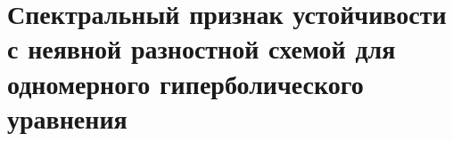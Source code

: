 \documentclass[__main__.tex]{subfiles}
\begin{document}
\section{Спектральный признак устойчивости с неявной разностной схемой для одномерного гиперболического уравнения}
\end{document}
